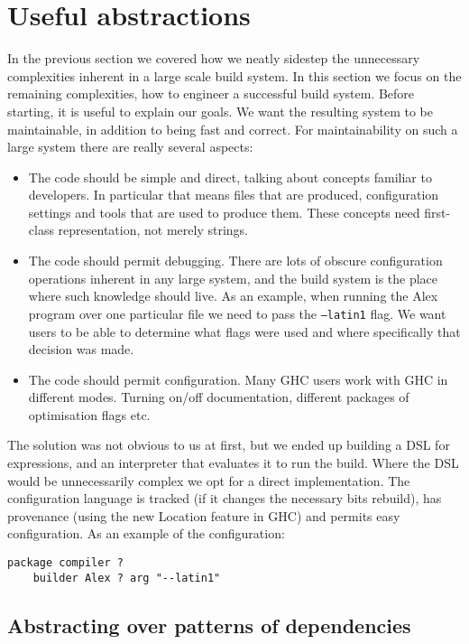 \section{Useful abstractions\label{sec:abstractions}}

In the previous section we covered how we neatly sidestep the unnecessary complexities inherent in a large scale build system. In this section we focus on the remaining complexities, how to engineer a successful build system. Before starting, it is useful to explain our goals. We want the resulting system to be maintainable, in addition to being fast and correct. For maintainability on such a large system there are really several aspects:

\begin{itemize}
\item The code should be simple and direct, talking about concepts familiar to developers. In particular that means files that are produced, configuration settings and tools that are used to produce them. These concepts need first-class representation, not merely strings.
\item The code should permit debugging. There are lots of obscure configuration operations inherent in any large system, and the build system is the place where such knowledge should live. As an example, when running the Alex program over one particular file we need to pass the \texttt{--latin1} flag. We want users to be able to determine what flags were used and where specifically that decision was made.
\item The code should permit configuration. Many GHC users work with GHC in different modes. Turning on/off documentation, different packages of optimisation flags etc.
\end{itemize}

The solution was not obvious to us at first, but we ended up building a DSL for expressions, and an interpreter that evaluates it to run the build. Where the DSL would be unnecessarily complex we opt for a direct implementation. The configuration language is tracked (if it changes the necessary bits rebuild), has provenance (using the new Location feature in GHC) and permits easy configuration. As an example of the configuration:

\begin{verbatim}
package compiler ?
    builder Alex ? arg "--latin1"
\end{verbatim}



\subsection{Abstracting over patterns of dependencies}



